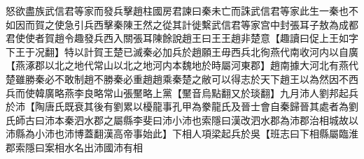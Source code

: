怒欲盡族武信君等家而發兵擊趙柱國房君諫曰秦未亡而誅武信君等家此生一秦也不如因而賀之使急引兵西擊秦陳王然之從其計徙繫武信君等家宫中封張耳子敖為成都君使使者賀趙令趣發兵西入關張耳陳餘說趙王曰王王趙非楚意【趣讀曰促上王如字下王于况翻】特以計賀王楚已滅秦必加兵於趙願王毋西兵北徇燕代南收河内以自廣【燕涿郡以北之地代常山以北之地河内本魏地於時屬河東郡】趙南據大河北有燕代楚雖勝秦必不敢制趙不勝秦必重趙趙乘秦楚之敝可以得志於天下趙王以為然因不西兵而使韓廣略燕李良略常山張黶略上黨【黶音烏點翻又於琰翻】九月沛人劉邦起兵於沛【陶唐氏既衰其後有劉累以櫌龍事孔甲為豢龍氏及晉士會自秦歸晉其處者為劉氏師古曰沛本秦泗水郡之屬縣李斐曰沛小沛也索隱曰漢改泗水郡為沛郡治相城故以沛縣為小沛也沛博蓋翻漢高帝事始此】下相人項梁起兵於吳【班志曰下相縣屬臨淮郡索隱曰案相水名出沛國沛有相